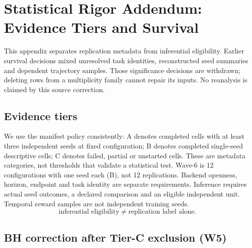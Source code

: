 %
%
%

\section{Statistical Rigor Addendum: Evidence Tiers and Survival}
\label{sec:stat_rigor}
\label{app:stat-rigor-addendum}

This appendix separates replication metadata from inferential eligibility.
Earlier survival decisions mixed unresolved task identities, reconstructed seed
summaries and dependent trajectory samples. Those significance decisions are
withdrawn; deleting rows from a multiplicity family cannot repair its inputs.
No reanalysis is claimed by this source correction.

\subsection{Evidence tiers}
\label{sec:stat-rigor-addendum:tiers}

We use the manifest policy consistently: A denotes completed cells with at
least three independent seeds at fixed configuration; B denotes completed
single-seed descriptive cells; C denotes failed, partial or unstarted cells.
These are metadata categories, not thresholds that validate a statistical test.
Wave-6 is 12 configurations with one seed each (B), not 12 replications.
Backend openness, horizon, endpoint and task identity are separate requirements.
Inference requires actual seed outcomes, a declared comparison and an eligible
independent unit. Temporal reward samples are not independent training seeds.
\begin{equation}\label{eq:tiers}
\text{inferential eligibility}\ne\text{replication label alone}.
\end{equation}

\subsection{BH correction after Tier-C exclusion (W5)}
\label{sec:stat-rigor-addendum:bh}


